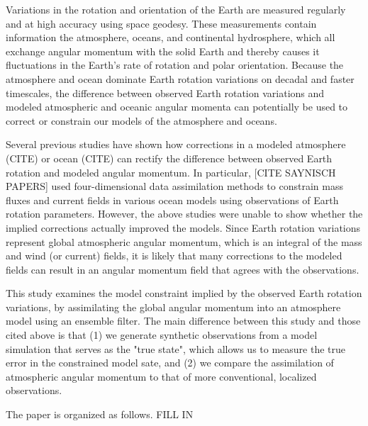 
Variations in the rotation and orientation of the Earth are measured regularly and at high accuracy using space geodesy. 
These measurements contain information the atmosphere, oceans, and continental hydrosphere, which all exchange angular momentum with the solid Earth and thereby causes it fluctuations in the Earth's rate of rotation and polar orientation. 
Because the atmosphere and ocean dominate Earth rotation variations on decadal and faster timescales, the difference between observed Earth rotation variations and modeled atmospheric and oceanic angular momenta can potentially be used to correct or constrain our models of the atmosphere and oceans. 

Several previous studies have shown how corrections in a modeled atmosphere (CITE) or ocean (CITE) can rectify the difference between observed Earth rotation and modeled angular momentum. 
In particular, [CITE SAYNISCH PAPERS] used four-dimensional data assimilation methods to constrain mass fluxes and current fields in various ocean models using observations of Earth rotation parameters. 
However, the above studies were unable to show whether the implied corrections actually improved the models. 
Since Earth rotation variations represent global atmospheric angular momentum, which is an integral of the mass and wind (or current) fields, it is likely that many corrections to the modeled fields can result in an angular momentum field that agrees with the observations. 

This study examines the model constraint implied by the observed Earth rotation variations, by assimilating the global angular momentum into an atmosphere model using an ensemble filter. 
The main difference between this study and those cited above is that (1) we generate synthetic observations from a model simulation that serves as the "true state", which allows us to measure the true error in the constrained model sate, and (2) we compare the assimilation of atmospheric angular momentum to that of more conventional, localized observations. 


The paper is organized as follows.  
\textcolor{alert}{FILL IN}
